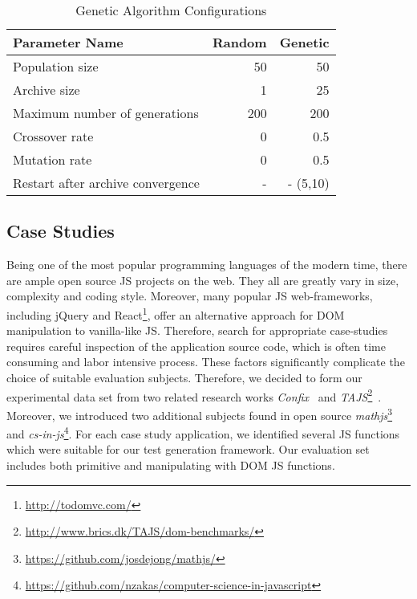 \documentclass[sigconf]{acmart}
\begin{document}
\begin{table}
  \caption{Genetic Algorithm Configurations}
  \label{tbl.gen.config}
    \footnotesize
  \begin{tabular}{l|r|r}
    \toprule
    \textbf{Parameter Name} & \textbf{Random} & \textbf{Genetic} \\
    \midrule
    Population size                   & 50  & 50 \\
    Archive size                      & 1   & 25 \\
    Maximum number of generations     & 200 & 200 \\
    Crossover rate                    & 0   & 0.5 \\
    Mutation rate                     & 0   & 0.5 \\
    Restart after archive convergence & -   & - (5,10) \\
    \bottomrule
  \end{tabular}
\end{table}


\subsection{Case Studies}
\label{sub.sec.case.studies}

Being one of the most popular programming languages of the modern time, there are ample open source JS projects on the web. They all are greatly vary in size, complexity and coding style. Moreover, many popular JS web-frameworks, including jQuery and React\footnote{\url{http://todomvc.com/}}, offer an alternative approach for DOM manipulation to vanilla-like JS. Therefore, search for appropriate case-studies requires careful inspection of the application source code, which is often time consuming and labor intensive process. These factors significantly complicate the choice of suitable evaluation subjects. Therefore, we decided to form our experimental data set from two related research works \emph{Confix}~\cite{amin:ase15} and \emph{TAJS}\footnote{\url{http://www.brics.dk/TAJS/dom-benchmarks/}}~\cite{dom2011}. Moreover, we introduced two additional subjects found in open source \emph{mathjs}\footnote{\url{https://github.com/josdejong/mathjs/}} and \emph{cs-in-js}\footnote{\url{https://github.com/nzakas/computer-science-in-javascript}}. For each case study application, we identified several JS functions which were suitable for our test generation framework. Our evaluation set includes both primitive and manipulating with DOM JS functions.
\end{document}
